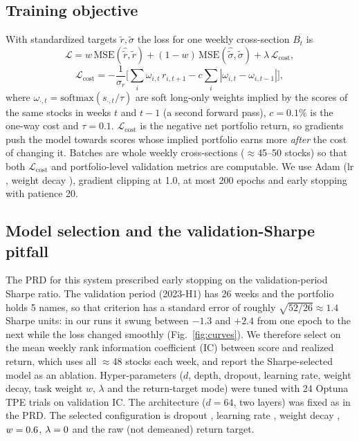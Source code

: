 \documentclass[conference]{IEEEtran}
\begin{document}
\subsection{Training objective}
With standardized targets $\tilde r,\tilde\sigma$ the loss for one weekly cross-section $B_t$ is
\begin{equation}
\mathcal{L}=w\,\mathrm{MSE}(\hat{\tilde r},\tilde r)+(1-w)\,\mathrm{MSE}(\hat{\tilde\sigma},\tilde\sigma)+\lambda\,\mathcal{L}_{\text{cost}},
\end{equation}
\begin{equation}
\mathcal{L}_{\text{cost}}=-\frac{1}{\sigma_r}\Big[\textstyle\sum_i \omega_{i,t}\,r_{i,t+1}-c\sum_i|\omega_{i,t}-\omega_{i,t-1}|\Big],
\end{equation}
where $\omega_{\cdot,t}=\mathrm{softmax}(s_{\cdot,t}/\tau)$ are soft long-only weights implied by the scores of the same stocks in weeks $t$ and $t{-}1$ (a second forward pass), $c=0.1\%$ is the one-way cost and $\tau=0.1$. $\mathcal{L}_{\text{cost}}$ is the negative net portfolio return, so gradients push the model towards scores whose implied portfolio earns more \emph{after} the cost of changing it. Batches are whole weekly cross-sections ($\approx$45--50 stocks) so that both $\mathcal{L}_{\text{cost}}$ and portfolio-level validation metrics are computable. We use Adam (lr \bestlr, weight decay \bestweightdecay), gradient clipping at 1.0, at most 200 epochs and early stopping with patience 20.

\subsection{Model selection and the validation-Sharpe pitfall}
The PRD for this system prescribed early stopping on the validation-period Sharpe ratio. The validation period (2023-H1) has 26 weeks and the portfolio holds 5 names, so that criterion has a standard error of roughly $\sqrt{52/26}\approx1.4$ Sharpe units: in our runs it swung between $-1.3$ and $+2.4$ from one epoch to the next while the loss changed smoothly (Fig.~\ref{fig:curves}). We therefore select on the mean weekly rank information coefficient (IC) between score and realized return, which uses all $\approx$48 stocks each week, and report the Sharpe-selected model as an ablation. Hyper-parameters ($d$, depth, dropout, learning rate, weight decay, task weight $w$, $\lambda$ and the return-target mode) were tuned with 24 Optuna TPE trials on validation IC. The architecture ($d=64$, two layers) was fixed as in the PRD. The selected configuration is dropout \bestdropout, learning rate \bestlr, weight decay \bestweightdecay, $w=0.6$, $\lambda=0$ and the raw (not demeaned) return target.
\end{document}
